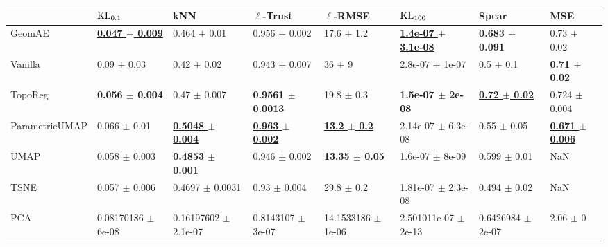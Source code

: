 \begin{tabular}{llllllll}
\toprule
{} &                             $\operatorname{KL}_{0.1}$ &                                       kNN &                             $\ell$-Trust &                           $\ell$-RMSE &                                 $\operatorname{KL}_{100}$ &                                  Spear &                                      MSE \\
\midrule
GeomAE         &   \underline{\textbf{0.047 $\pm$ 0.009}} &                          0.464 $\pm$ 0.01 &                        0.956 $\pm$ 0.002 &                        17.6 $\pm$ 1.2 &   \underline{\textbf{1.4e-07 $\pm$ 3.1e-08}} &             \textbf{0.683 $\pm$ 0.091} &                          0.73 $\pm$ 0.02 \\
Vanilla        &                          0.09 $\pm$ 0.03 &                           0.42 $\pm$ 0.02 &                        0.943 $\pm$ 0.007 &                            36 $\pm$ 9 &                          2.8e-07 $\pm$ 1e-07 &                          0.5 $\pm$ 0.1 &                 \textbf{0.71 $\pm$ 0.02} \\
TopoReg        &               \textbf{0.056 $\pm$ 0.004} &                          0.47 $\pm$ 0.007 &             \textbf{0.9561 $\pm$ 0.0013} &                        19.8 $\pm$ 0.3 &                 \textbf{1.5e-07 $\pm$ 2e-08} &   \underline{\textbf{0.72 $\pm$ 0.02}} &                        0.724 $\pm$ 0.004 \\
ParametricUMAP &                         0.066 $\pm$ 0.01 &   \underline{\textbf{0.5048 $\pm$ 0.004}} &   \underline{\textbf{0.963 $\pm$ 0.002}} &   \underline{\textbf{13.2 $\pm$ 0.2}} &                       2.14e-07 $\pm$ 6.3e-08 &                        0.55 $\pm$ 0.05 &   \underline{\textbf{0.671 $\pm$ 0.006}} \\
UMAP           &                        0.058 $\pm$ 0.003 &               \textbf{0.4853 $\pm$ 0.001} &                        0.946 $\pm$ 0.002 &             \textbf{13.35 $\pm$ 0.05} &                          1.6e-07 $\pm$ 8e-09 &                       0.599 $\pm$ 0.01 &                                      NaN \\
TSNE           &                        0.057 $\pm$ 0.006 &                       0.4697 $\pm$ 0.0031 &                         0.93 $\pm$ 0.004 &                        29.8 $\pm$ 0.2 &                       1.81e-07 $\pm$ 2.3e-08 &                       0.494 $\pm$ 0.02 &                                      NaN \\
PCA            &                   0.08170186 $\pm$ 6e-08 &                  0.16197602 $\pm$ 2.1e-07 &                    0.8143107 $\pm$ 3e-07 &                14.1533186 $\pm$ 1e-06 &                     2.501011e-07 $\pm$ 2e-13 &                  0.6426984 $\pm$ 2e-07 &                             2.06 $\pm$ 0 \\
\bottomrule
\end{tabular}
